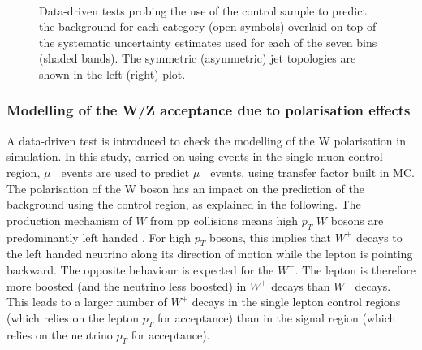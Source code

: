 \begin{figure}[h!]
  \begin{center}
    ~~
    \caption{Data-driven tests probing the use of the \mj control sample
      to predict the \znunu background for each
      \njet category (open symbols) overlaid on top of the systematic
      uncertainty estimates used for each of the seven \scalht bins (shaded bands).  
      The symmetric (asymmetric) jet topologies are shown in the left (right) plot. 
    }
    \label{fig:closureMuToMuMu}
  \end{center} 
\end{figure}




\subsubsection*{Modelling of the W/Z acceptance due to polarisation effects}
\label{sec:tfSyst_Wpol}
A data-driven test is introduced to check the modelling of the W polarisation in simulation. 
In this study, carried on using events in the single-muon control region, $\mu^{+}$ events 
are used to predict $\mu^{-}$ events, using transfer factor built in MC. 
The polarisation of the W boson has an impact on the prediction 
of the \znunu background using the \mj control region, as explained in the following. 
The production mechanism of $W$ from pp
collisions means high $p_T$ $W$ bosons are predominantly left handed
\cite{WPol}.  For high $p_T$ bosons, this implies that $W^+$ decays to
the left handed neutrino along its direction of motion while the
lepton is pointing backward. The opposite behaviour is expected for
the $W^-$. The lepton is therefore more boosted (and the neutrino less
boosted) in $W^+$ decays than $W^-$ decays.  This leads to a larger
number of $W^+$ decays in the single lepton control regions (which
relies on the lepton $p_T$ for acceptance) than in the signal region
(which relies on the neutrino $p_T$ for acceptance).

